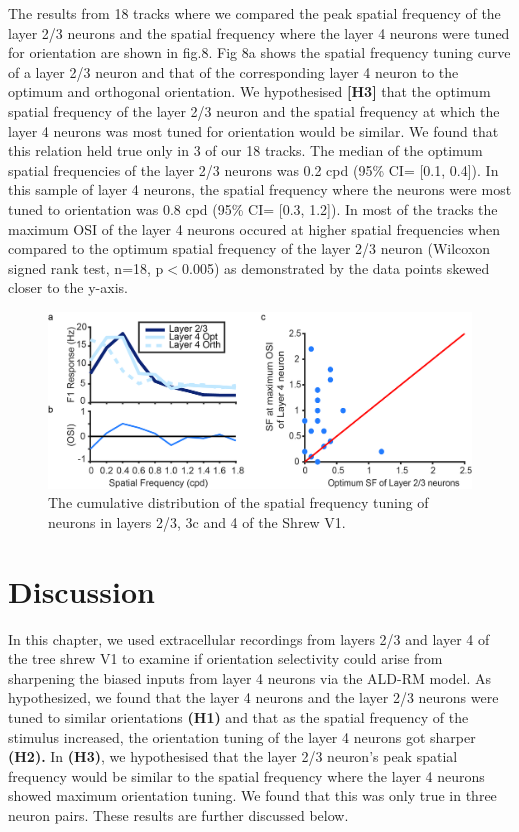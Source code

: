 The results from 18 tracks where we compared the peak spatial frequency
of the layer 2/3 neurons and the spatial frequency where the layer 4
neurons were tuned for orientation are shown in fig.8. Fig 8a shows the
spatial frequency tuning curve of a layer 2/3 neuron and that of the
corresponding layer 4 neuron to the optimum and orthogonal orientation.
We hypothesised \textbf{{[}H3{]}} that the optimum spatial frequency of
the layer 2/3 neuron and the spatial frequency at which the layer 4
neurons was most tuned for orientation would be similar. We found that
this relation held true only in 3 of our 18 tracks. The median of the
optimum spatial frequencies of the layer 2/3 neurons was 0.2 cpd (95\%
CI= {[}0.1, 0.4{]}). In this sample of layer 4 neurons, the spatial
frequency where the neurons were most tuned to orientation was 0.8 cpd
(95\% CI= {[}0.3, 1.2{]}). In most of the tracks the maximum OSI of the
layer 4 neurons occured at higher spatial frequencies when compared to
the optimum spatial frequency of the layer 2/3 neuron (Wilcoxon signed
rank test, n=18, p\(<\)0.005) as demonstrated by the data points skewed
closer to the y-axis.

\begin{figure}[H]
	
	\includegraphics[width=\linewidth]{ShrewV1/sfsummary.jpg}
	\caption{The cumulative distribution of the spatial frequency tuning of neurons in layers 2/3, 3c and 4 of the Shrew V1.}
	\label{fig:sfsum}
\end{figure}



\section{Discussion}

In this chapter, we used extracellular recordings from layers 2/3 and
layer 4 of the tree shrew V1 to examine if orientation selectivity could
arise from sharpening the biased inputs from layer 4 neurons via the
ALD-RM model. As hypothesized, we found that the layer 4 neurons and the
layer 2/3 neurons were tuned to similar orientations \textbf{(H1)} and
that as the spatial frequency of the stimulus increased, the orientation
tuning of the layer 4 neurons got sharper \textbf{(H2).} In
\textbf{(H3)}, we hypothesised that the layer 2/3 neuron's peak spatial
frequency would be similar to the spatial frequency where the layer 4
neurons showed maximum orientation tuning. We found that this was only
true in three neuron pairs. These results are further discussed below.


